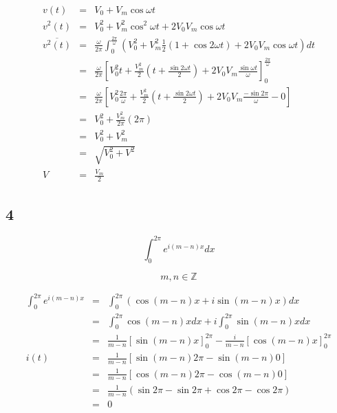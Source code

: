 \documentclass[a4paper,12pt]{article}
\begin{document}
\begin{eqnarray*}
	 v(t) & = & V_{0} + V_{m} \cos{\omega t} \\
v^{2}(t) & = & V^{2}_{0} + V_{m}^{2}\cos^{2}{\omega t} + 2V_{0}V_{m}	\cos{\omega t} \\
\overline{v^{2}(t)} & = & \frac{\omega}{2 \pi} \int^{\frac{2
\pi}{\omega}}_{0} \left(V_{0}^{2} + V_{m}^{2}\frac{1}{2}(1 + \cos{2
\omega t}) + 2 V_{0}V_{m} \cos{\omega t}\right)dt \\
			& = & \frac{\omega}{2 \pi} \left[ V_{0}^{2}t +
			\frac{V^{2}_{m}}{2}\left(t + \frac{\sin{2 \omega t}}{2}\right)
			+ 2V_{0}V_{m}\frac{\sin{\omega t}}{\omega} \right]^{\frac{2
			\pi}{\omega}}_{0} \\
			& = & \frac{\omega}{2 \pi} \left[ V_{0}^{2}\frac{2 \pi}{\omega}
			+ \frac{V_{m}^{2}}{2} \left(t + \frac{\sin{2 \omega t}}{2}\right) 
			+ 2V_{0}V_{m}\frac{-\sin{2 \pi}}{\omega} - 0 \right] \\
			& = & V^{2}_{0} + \frac{V_{m}^{2}}{2 \pi}(2 \pi) \\
			& = & V^{2}_{0} + V_{m}^{2} \\
			& = & \sqrt{V^{2}_{0} + V^{2}} \\
V			& = & \frac{V_{m}}{2}			
\end{eqnarray*}

\subsection{4}

\[ \int^{2 \pi}_{0} e^{i(m - n)x} dx \]

\[ m, n \in \mathbb{Z} \]

\begin{eqnarray*}
	\int^{2 \pi}_{0} e^{i(m - n)x} & = & \int^{2 \pi}_{0} (\cos{(m -n)}x
	+ i \sin{(m -n)}x)dx \\
	& = & \int^{2 \pi}_{0} \cos{(m - n)} xdx + i \int^{2 \pi}_{0} \sin{(m
	- n)}x dx \\
	& = & \frac{1}{m - n} [\sin{(m - n)}x]^{2 \pi}_{0} - \frac{i}{m - n}
	[\cos{(m - n)}x]^{2 \pi}_{0} \\
	i(t) & = & \frac{1}{m - n} [\sin{(m - n)}2 \pi - \sin{(m - n)}0 ] \\
		  & = & \frac{1}{m - n} [ \cos{(m - n)} 2 \pi - \cos{(m - n)}0 ] \\
		  & = & \frac{1}{m - n} (\sin{2 \pi} - \sin{2 \pi} + \cos{2 \pi} -
		  \cos{2 \pi}) \\
		  & = & 0
\end{eqnarray*}
\end{document}
